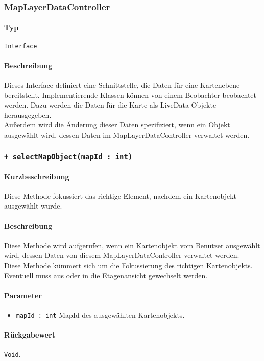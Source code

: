 \subsubsection{MapLayerDataController}\label{App_Map_ViewModel_MapLayerDataController}
\paragraph*{Typ} 
\texttt{Interface}
\paragraph*{Beschreibung}
Dieses Interface definiert eine Schnittstelle, die Daten für eine Kartenebene bereitstellt.
Implementierende Klassen können von einem Beobachter beobachtet werden. Dazu werden die 
Daten für die Karte als LiveData-Objekte herausgegeben.\\
Außerdem wird die Änderung dieser Daten spezifiziert, wenn ein Objekt ausgewählt wird, dessen
Daten im MapLayerDataController verwaltet werden.

\subsubsection*{\texttt{+ selectMapObject(mapId : int)}}\label{App_Map_ViewModel_selectMapObject}%
\paragraph*{Kurzbeschreibung}
Diese Methode fokussiert das richtige Element, nachdem ein Kartenobjekt ausgewählt wurde.
\paragraph*{Beschreibung}
Diese Methode wird aufgerufen, wenn ein Kartenobjekt vom Benutzer ausgewählt wird, dessen 
Daten von diesem MapLayerDataController verwaltet werden.\\
Diese Methode kümmert sich um die Fokussierung des richtigen Kartenobjekts. Eventuell muss 
aus oder in die Etagenansicht gewechselt werden.
\paragraph*{Parameter}
\begin{itemize}
    \item \texttt{mapId : int} MapId des ausgewählten Kartenobjekts.
\end{itemize}
\paragraph*{Rückgabewert}
\texttt{Void}.

